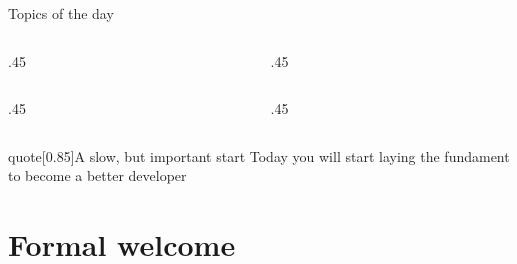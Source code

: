 \begin{frame}
    \titlepage
\end{frame}
\makeatletter
\setcounter{section}{-1\relax}%
\relax\space
\makeatother
\begin{frame}[label=toc,plain,noframenumbering]{Topics of the day}
    \begin{columns}[t]
        \begin{column}{.45\textwidth}
            \hspace*{4mm}
            \begin{minipage}[t]{\textwidth}
                \begin{NoHyper}
                    \tableofcontents[currentsection,sections={0}]
                \end{NoHyper}
            \end{minipage}
        \end{column}
        \begin{column}{.45\textwidth}
            \begin{minipage}[t][0.2\textheight]{\textwidth}
            \end{minipage}
        \end{column}
    \end{columns}
    \vspace{-10mm}
    \begin{columns}[t]
        \begin{column}{.45\textwidth}
            \hspace*{4mm}
            \begin{minipage}[t]{\textwidth}
                \tableofcontents[sections={1-3},hideallsubsections]
            \end{minipage}
        \end{column}
        \begin{column}{.45\textwidth}
            \begin{minipage}[t][0.5\textheight]{\textwidth}
                \tableofcontents[sections={4-},hideallsubsections]
            \end{minipage}
        \end{column}
    \end{columns}
    \vspace{-18mm}
    \begin{varblock}{quote}[0.85\textwidth]{A slow, but important start}
        \normalfont\small
        Today you will start laying the fundament to become a better developer
    \end{varblock}
\end{frame}
\section{Formal welcome} %